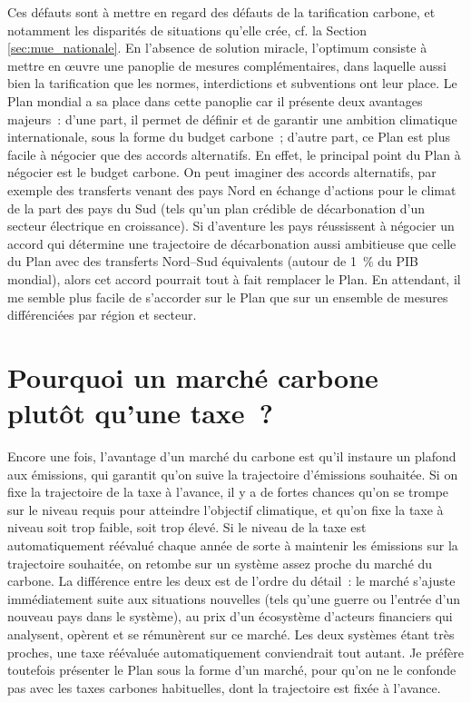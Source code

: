\documentclass[a5paper,french,openany]{memoir}
\begin{document}
Ces défauts sont à mettre en regard des défauts de la tarification carbone, et notamment les disparités de situations qu'elle crée, cf. la Section \ref{sec:mue_nationale}. En l'absence de solution miracle, l'optimum consiste à mettre en œuvre une panoplie de mesures complémentaires, dans laquelle aussi bien la tarification que les normes, interdictions et subventions ont leur place. Le Plan mondial a sa place dans cette panoplie car il présente deux avantages majeurs~: d'une part, il permet de définir et de garantir une ambition climatique internationale, sous la forme du budget carbone~; d'autre part, ce Plan est plus facile à négocier que des accords alternatifs. En effet, le principal point du Plan à négocier est le budget carbone. On peut imaginer des accords alternatifs, par exemple des transferts venant des pays Nord en échange d'actions pour le climat de la part des pays du Sud (tels qu'un plan crédible de décarbonation d'un secteur électrique en croissance). Si d'aventure les pays réussissent à négocier un accord qui détermine une trajectoire de décarbonation aussi ambitieuse que celle du Plan avec des transferts Nord--Sud équivalents (autour de 1~\% du PIB mondial), alors cet accord pourrait tout à fait remplacer le Plan. En attendant, il me semble plus facile de s'accorder sur le Plan que sur un ensemble de mesures différenciées par région et secteur.


\section*{\normalsize Pourquoi un marché carbone plutôt qu'une taxe~?}\label{q:taxe}

Encore une fois, l'avantage d'un marché du carbone est qu'il instaure un plafond aux émissions, qui garantit qu'on suive la trajectoire d'émissions souhaitée. Si on fixe la trajectoire de la taxe à l'avance, il y a de fortes chances qu'on se trompe sur le niveau requis pour atteindre l'objectif climatique, et qu'on fixe la taxe à niveau soit trop faible, soit trop élevé. Si le niveau de la taxe est automatiquement réévalué chaque année de sorte à maintenir les émissions sur la trajectoire souhaitée, on retombe sur un système assez proche du marché du carbone. La différence entre les deux est de l'ordre du détail~: le marché s'ajuste immédiatement suite aux situations nouvelles (tels qu'une guerre ou l'entrée d'un nouveau pays dans le système), au prix d'un écosystème d'acteurs financiers qui analysent, opèrent et se rémunèrent sur ce marché. Les deux systèmes étant très proches, une taxe réévaluée automatiquement conviendrait tout autant. Je préfère toutefois présenter le Plan sous la forme d'un marché, pour qu'on ne le confonde pas avec les taxes carbones habituelles, dont la trajectoire est fixée à l'avance. 
\end{document}

